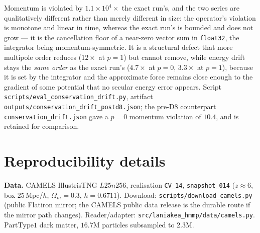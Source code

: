 \begin{center}
\end{center}

\noindent Momentum is violated by $1.1\times10^{4}\times$ the exact run's, and the two series are
qualitatively different rather than merely different in size: the operator's violation is monotone and
linear in time, whereas the exact run's is bounded and does not grow --- it is the cancellation floor of
a near-zero vector sum in \texttt{float32}, the integrator being momentum-symmetric. It is a
structural defect that more multipole order reduces ($12\times$ at $p{=}1$) but cannot remove, while
energy drift stays the \emph{same order} as the exact run's ($4.7\times$ at $p{=}0$, $3.3\times$ at
$p{=}1$), because it is set by the integrator and the approximate force remains close enough to the
gradient of some potential that no secular energy error appears. Script
\texttt{scripts/\allowbreak eval\_\allowbreak conservation\_\allowbreak drift.\allowbreak py}, artifact
\texttt{outputs/\allowbreak conservation\_\allowbreak drift\_\allowbreak postd8.\allowbreak json}; the pre-D8 counterpart
\texttt{conservation\_\allowbreak drift.\allowbreak json} gave a $p{=}0$ momentum violation of $10.4$, and is retained for
comparison.

\section{Reproducibility details}\label{app:repro}
\noindent\textbf{Data.} CAMELS IllustrisTNG $L25n256$, realisation \texttt{CV\_14},
\texttt{snapshot\_014} ($z\approx6$, box $25$\,Mpc/$h$, $\Omega_m=0.3$, $h=0.6711$). Download:
\texttt{scripts/\allowbreak download\_\allowbreak camels.\allowbreak py} (public Flatiron mirror; the CAMELS public data release
\citep{camels2023} is the durable route if the mirror path changes). Reader/adapter:
\texttt{src/\allowbreak laniakea\_\allowbreak hmmp/\allowbreak data/\allowbreak camels.\allowbreak py}. $\mathrm{PartType1}$ dark matter, $16.7$M particles
subsampled to $2.3$M.

